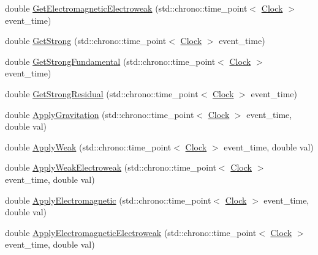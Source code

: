 \begin{DoxyCompactItemize}
\item 
double \hyperlink{class_composite_force_particle_ac26d7aab0daefcf13c68aba9e0f2ed53}{Get\+Electromagnetic\+Electroweak} (std\+::chrono\+::time\+\_\+point$<$ \hyperlink{universe_8h_a0ef8d951d1ca5ab3cfaf7ab4c7a6fd80}{Clock} $>$ event\+\_\+time)
\item 
double \hyperlink{class_composite_force_particle_a9818d469c9841eaf77fbe329b0953354}{Get\+Strong} (std\+::chrono\+::time\+\_\+point$<$ \hyperlink{universe_8h_a0ef8d951d1ca5ab3cfaf7ab4c7a6fd80}{Clock} $>$ event\+\_\+time)
\item 
double \hyperlink{class_composite_force_particle_abc8597f3b4f7cf755ab4618bd624b046}{Get\+Strong\+Fundamental} (std\+::chrono\+::time\+\_\+point$<$ \hyperlink{universe_8h_a0ef8d951d1ca5ab3cfaf7ab4c7a6fd80}{Clock} $>$ event\+\_\+time)
\item 
double \hyperlink{class_composite_force_particle_a24214566eb5b44340d5563b6583052e8}{Get\+Strong\+Residual} (std\+::chrono\+::time\+\_\+point$<$ \hyperlink{universe_8h_a0ef8d951d1ca5ab3cfaf7ab4c7a6fd80}{Clock} $>$ event\+\_\+time)
\item 
double \hyperlink{class_composite_force_particle_ae26a03c2970a3825e8583a811339b28d}{Apply\+Gravitation} (std\+::chrono\+::time\+\_\+point$<$ \hyperlink{universe_8h_a0ef8d951d1ca5ab3cfaf7ab4c7a6fd80}{Clock} $>$ event\+\_\+time, double val)
\item 
double \hyperlink{class_composite_force_particle_a1fd171a0c6fab0cbf9a45a0d24607bde}{Apply\+Weak} (std\+::chrono\+::time\+\_\+point$<$ \hyperlink{universe_8h_a0ef8d951d1ca5ab3cfaf7ab4c7a6fd80}{Clock} $>$ event\+\_\+time, double val)
\item 
double \hyperlink{class_composite_force_particle_a3c1c0b427c633f0685f1d812e02b92ff}{Apply\+Weak\+Electroweak} (std\+::chrono\+::time\+\_\+point$<$ \hyperlink{universe_8h_a0ef8d951d1ca5ab3cfaf7ab4c7a6fd80}{Clock} $>$ event\+\_\+time, double val)
\item 
double \hyperlink{class_composite_force_particle_afa4dc18258722b3c85fbc9789a4297a5}{Apply\+Electromagnetic} (std\+::chrono\+::time\+\_\+point$<$ \hyperlink{universe_8h_a0ef8d951d1ca5ab3cfaf7ab4c7a6fd80}{Clock} $>$ event\+\_\+time, double val)
\item 
double \hyperlink{class_composite_force_particle_a5f6aef9e15e2e5f346c7ede76ae6458b}{Apply\+Electromagnetic\+Electroweak} (std\+::chrono\+::time\+\_\+point$<$ \hyperlink{universe_8h_a0ef8d951d1ca5ab3cfaf7ab4c7a6fd80}{Clock} $>$ event\+\_\+time, double val)
\item 

\end{DoxyCompactItemize}
